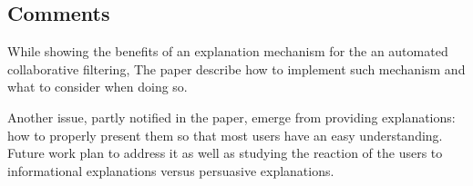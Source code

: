 \documentclass{article}
\begin{document}
\subsection*{Comments}

While showing the benefits of an explanation mechanism for the an automated
collaborative filtering, The paper describe how to implement such mechanism
and what to consider when doing so. 

Another issue, partly notified in the paper, emerge from providing
explanations: how to properly present them so that most users have an easy
understanding. Future work plan to address it as well as studying the reaction
of the users to informational explanations versus persuasive explanations.
\end{document}

